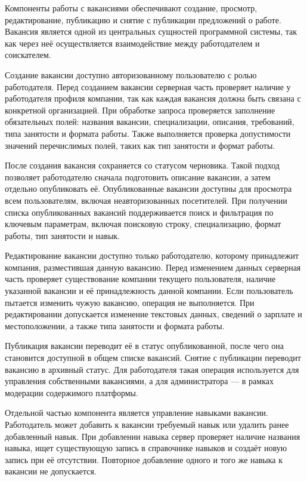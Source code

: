 Компоненты работы с вакансиями обеспечивают создание, просмотр, редактирование, публикацию и снятие с публикации предложений о работе. Вакансия является одной из центральных сущностей программной системы, так как через неё осуществляется взаимодействие между работодателем и соискателем.

Создание вакансии доступно авторизованному пользователю с ролью работодателя. Перед созданием вакансии серверная часть проверяет наличие у работодателя профиля компании, так как каждая вакансия должна быть связана с конкретной организацией. При обработке запроса проверяется заполнение обязательных полей: названия вакансии, специализации, описания, требований, типа занятости и формата работы. Также выполняется проверка допустимости значений перечислимых полей, таких как тип занятости и формат работы.

После создания вакансия сохраняется со статусом черновика. Такой подход позволяет работодателю сначала подготовить описание вакансии, а затем отдельно опубликовать её. Опубликованные вакансии доступны для просмотра всем пользователям, включая неавторизованных посетителей. При получении списка опубликованных вакансий поддерживается поиск и фильтрация по ключевым параметрам, включая поисковую строку, специализацию, формат работы, тип занятости и навык.

Редактирование вакансии доступно только работодателю, которому принадлежит компания, разместившая данную вакансию. Перед изменением данных серверная часть проверяет существование компании текущего пользователя, наличие указанной вакансии и её принадлежность данной компании. Если пользователь пытается изменить чужую вакансию, операция не выполняется. При редактировании допускается изменение текстовых данных, сведений о зарплате и местоположении, а также типа занятости и формата работы.

Публикация вакансии переводит её в статус опубликованной, после чего она становится доступной в общем списке вакансий. Снятие с публикации переводит вакансию в архивный статус. Для работодателя такая операция используется для управления собственными вакансиями, а для администратора — в рамках модерации содержимого платформы.

Отдельной частью компонента является управление навыками вакансии. Работодатель может добавить к вакансии требуемый навык или удалить ранее добавленный навык. При добавлении навыка сервер проверяет наличие названия навыка, ищет существующую запись в справочнике навыков и создаёт новую запись при её отсутствии. Повторное добавление одного и того же навыка к вакансии не допускается.

